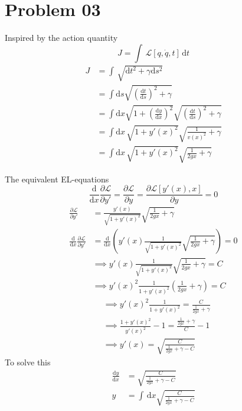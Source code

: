 \documentclass[10pts, letterpaper]{article}
\begin{document}
\section*{Problem 03} 
Inspired by the action quantity 
\[
	J = \int \, \mathcal{L }[q, \dot{q}, t] \, \mathrm{d} t
\] 
\begin{align*}
	J &= \int \, \sqrt{\mathrm{d} t^2 + \gamma \mathrm{d} s ^2 }\\ 
	&=  \int \mathrm{d} s \sqrt{ 
		\left(\frac{\mathrm{d} t}{\mathrm{d} s}\right)^2 + \gamma
	} \\
	&= 
\int \mathrm{d} x
\sqrt{1 + \left( \frac{\mathrm{d} y}{\mathrm{d} x}\right)^2 } 
\sqrt{ \left(\frac{\mathrm{d} t}{\mathrm{d} s}\right)^2 + \gamma } 
	\\
	&= 
\int
\mathrm{d} x \, 
\sqrt{1 + y'(x) ^2 } 
\sqrt{\frac{1}{v(x)^2} + \gamma} \\
	&= 
\int
\mathrm{d} x \, 
\sqrt{1 + y' (x )^2 } 
\sqrt{\frac{1}{2 g x } + \gamma} 
\end{align*}

The equivalent EL-equations 
\[
\frac{\mathrm{d} }{\mathrm{d} x} 
\frac{\partial \mathcal L }{\partial y'}  = 
\frac{\partial \mathcal L}{\partial y} = 
\frac{\partial \mathcal L[y'(x), x] }{\partial y} =  0 
\]
\begin{align*}
	\frac{\partial \mathcal L }{\partial y'} &= 
\frac{y'(x)}{\sqrt{1 + y'(x)^2 }  } 
\sqrt{\frac{1}{2 g x} + \gamma } 
	\\
	\frac{\mathrm{d} }{\mathrm{d} x } \frac{\partial \mathcal L }{\partial y'} &= 
\frac{\mathrm{d} }{\mathrm{d} x} \left( y'(x) \frac{1}{\sqrt{1 + y'(x)^2 }  } 
\sqrt{\frac{1}{2 g x} + \gamma } 
\right) 	= 0 \\
										   &\implies
 y'(x) \frac{1}{\sqrt{1 + y'(x)^2 }  } 
 \sqrt{\frac{1}{2 g x} + \gamma }  = C  \tag{$C$ is dummy constant} \\ 
										   &\implies
										   y'(x)^2
										   \frac{1}{1 + y'(x)^2}
										   \left(
\frac{1}{2g x}  + \gamma 
										   \right) = C
\end{align*}
\begin{align*}
&\implies
y'(x) ^2 \frac{1}{1 + y'(x)^2} = \frac{C}{\frac{1}{2gx} + \gamma} \\
&\implies
\frac{1 + y'(x)^2 }{y'(x)^2} -1 = \frac{ \frac{1}{2gx} + \gamma }{C} - 1 \\ 
&\implies
y'(x) = \sqrt{\frac{C}{ \frac{1}{2gx} + \gamma - C}} 
\end{align*}
To solve this 
\begin{align*}
	\frac{\mathrm{d} y}{\mathrm{d} x} &= \sqrt{\frac{C}{ \frac{1}{2gx } + \gamma - C}}  \\
	y &= \int \, \mathrm{d} x 
	\sqrt{\frac{C}{ \frac{1}{2gx } + \gamma - C}}  
\end{align*}
\end{document}
